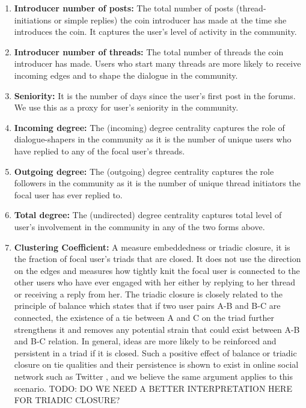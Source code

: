 \begin{enumerate}[topsep=0pt,itemsep=-0.5ex,partopsep=1ex,parsep=1ex]
  \item \textbf{Introducer number of posts:} The total number of posts (thread-initiations or simple replies) the coin introducer has made at the time she introduces the coin. It captures the user's level of activity in the community.
  \item \textbf{Introducer number of threads:} The total number of threads the coin introducer has made. Users who start many threads are more likely to receive incoming edges and to shape the dialogue in the community.
  \item \textbf{Seniority:} It is the number of days since the user's first post in the forums. We use this as a proxy for user's seniority in the community.
  \item \textbf{Incoming degree:} The (incoming) degree centrality captures the role of dialogue-shapers in the community as it is the number of unique users who have replied to any of the focal user's threads.
  \item \textbf{Outgoing degree:} The (outgoing) degree centrality captures the role followers in the community as it is the number of unique thread initiators the focal user has ever replied to.
  \item \textbf{Total degree:} The (undirected) degree centrality captures total level of user's involvement in the community in any of the two forms above.
  \item \textbf{Clustering Coefficient:} A measure embeddedness or triadic closure, it is the fraction of focal user's triads that are closed. It does not use the direction on the edges and measures how tightly knit the focal user is connected to the other users who have ever engaged with her either by replying to her thread or receiving a reply from her. The triadic closure is closely related to the principle of balance which states that if two user pairs A-B and B-C are connected, the existence of a tie between A and C on the triad further strengthens it and removes any potential strain that could exist between A-B and B-C relation. In general, ideas are more likely to be reinforced and persistent in a triad if it is closed. Such a positive effect of balance or triadic closure on tie qualities and their persistence is shown to exist in online social network such as Twitter \cite{KleinbergBalance}, and we believe the same argument applies to this scenario.
  TODO: DO WE NEED A BETTER INTERPRETATION HERE FOR TRIADIC CLOSURE?

\end{enumerate}
